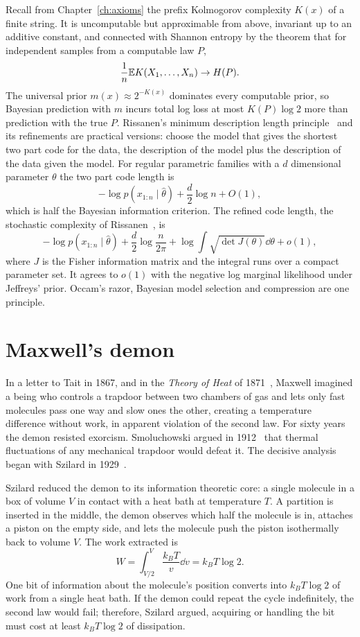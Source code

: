 Recall from Chapter~\ref{ch:axioms} the prefix Kolmogorov complexity $K(x)$ of a finite string. It is uncomputable but approximable from above, invariant up to an additive constant, and connected with Shannon entropy by the theorem that for independent samples from a computable law $P$,
\[
\frac1n\mathbb{E} K(X_1,\dots,X_n)\to H(P).
\]
The universal prior $m(x)\approx2^{-K(x)}$ dominates every computable prior, so Bayesian prediction with $m$ incurs total log loss at most $K(P)\log2$ more than prediction with the true $P$. Rissanen's minimum description length principle~\cite{rissanen1978} and its refinements are practical versions: choose the model that gives the shortest two part code for the data, the description of the model plus the description of the data given the model. For regular parametric families with a $d$ dimensional parameter $\theta$ the two part code length is
\[
-\log p(x_{1:n}\mid\hat\theta)+\frac d2\log n+O(1),
\]
which is half the Bayesian information criterion. The refined code length, the stochastic complexity of Rissanen~\cite{rissanen1996}, is
\[
-\log p(x_{1:n}\mid\hat\theta)+\frac d2\log\frac n{2\pi}+\log\int\sqrt{\det J(\theta)}\dd\theta+o(1),
\]
where $J$ is the Fisher information matrix and the integral runs over a compact parameter set. It agrees to $o(1)$ with the negative log marginal likelihood under Jeffreys' prior. Occam's razor, Bayesian model selection and compression are one principle.

\section{Maxwell's demon}

In a letter to Tait in 1867, and in the \emph{Theory of Heat} of 1871~\cite{maxwell1871}, Maxwell imagined a being who controls a trapdoor between two chambers of gas and lets only fast molecules pass one way and slow ones the other, creating a temperature difference without work, in apparent violation of the second law. For sixty years the demon resisted exorcism. Smoluchowski argued in 1912~\cite{smoluchowski1912} that thermal fluctuations of any mechanical trapdoor would defeat it. The decisive analysis began with Szilard in 1929~\cite{szilard1929}.

Szilard reduced the demon to its information theoretic core: a single molecule in a box of volume $V$ in contact with a heat bath at temperature $T$. A partition is inserted in the middle, the demon observes which half the molecule is in, attaches a piston on the empty side, and lets the molecule push the piston isothermally back to volume $V$. The work extracted is
\[
W = \int_{V/2}^{V}\frac{k_BT}{v}\dd v = k_BT\log2.
\]
One bit of information about the molecule's position converts into $k_BT\log2$ of work from a single heat bath. If the demon could repeat the cycle indefinitely, the second law would fail; therefore, Szilard argued, acquiring or handling the bit must cost at least $k_BT\log2$ of dissipation.


